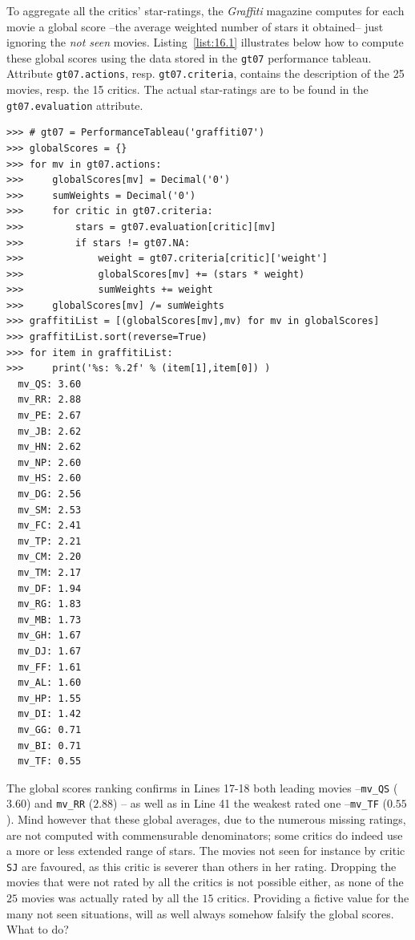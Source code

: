 To aggregate all the critics' star-ratings, the \emph{Graffiti} magazine computes for each movie a global score --the average weighted number of stars it obtained-- just ignoring the \emph{not seen} movies. Listing~\vref{list:16.1} illustrates below how to compute these global scores using the data stored in the \texttt{gt07} performance tableau. Attribute \texttt{gt07.actions}, resp. \texttt{gt07.criteria}, contains the description of the 25 movies, resp. the 15 critics. The actual star-ratings are to be found in the \texttt{gt07.evaluation} attribute.
\begin{lstlisting}[caption={Computing the average weighted number of stars per movie},label=list:16.1,basicstyle=\ttfamily\scriptsize]
>>> # gt07 = PerformanceTableau('graffiti07')
>>> globalScores = {}
>>> for mv in gt07.actions:
>>>     globalScores[mv] = Decimal('0')
>>>     sumWeights = Decimal('0')
>>>     for critic in gt07.criteria:
>>>         stars = gt07.evaluation[critic][mv]
>>>         if stars != gt07.NA:
>>>             weight = gt07.criteria[critic]['weight']
>>>             globalScores[mv] += (stars * weight)
>>>             sumWeights += weight
>>>     globalScores[mv] /= sumWeights
>>> graffitiList = [(globalScores[mv],mv) for mv in globalScores]
>>> graffitiList.sort(reverse=True)
>>> for item in graffitiList:
>>>     print('%s: %.2f' % (item[1],item[0]) )
  mv_QS: 3.60
  mv_RR: 2.88
  mv_PE: 2.67
  mv_JB: 2.62
  mv_HN: 2.62
  mv_NP: 2.60
  mv_HS: 2.60
  mv_DG: 2.56
  mv_SM: 2.53
  mv_FC: 2.41
  mv_TP: 2.21
  mv_CM: 2.20
  mv_TM: 2.17
  mv_DF: 1.94
  mv_RG: 1.83
  mv_MB: 1.73
  mv_GH: 1.67
  mv_DJ: 1.67
  mv_FF: 1.61
  mv_AL: 1.60
  mv_HP: 1.55
  mv_DI: 1.42
  mv_GG: 0.71
  mv_BI: 0.71
  mv_TF: 0.55
\end{lstlisting}

The global scores ranking confirms in Lines 17-18 both leading movies --\texttt{mv\_QS} ($3.60$) and \texttt{mv\_RR} ($2.88$) -- as well as in Line 41 the weakest rated one --\texttt{mv\_TF} ($0.55$). Mind however that these global averages, due to the numerous missing ratings, are not computed with commensurable denominators; some critics do indeed use a more or less extended range of stars. The movies not seen for instance by critic \texttt{SJ} are favoured, as this critic is severer than others in her rating. Dropping the movies that were not rated by all the critics is not possible either, as none of the $25$ movies was actually rated by all the $15$ critics. Providing a fictive value for the many not seen situations, will as well always somehow falsify the global scores. What to do?

